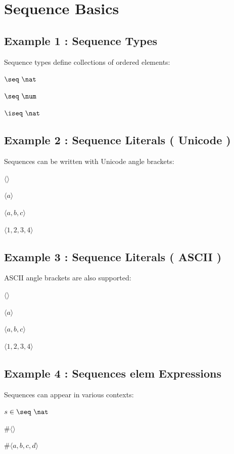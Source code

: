 \documentclass[a4paper,10pt,fleqn]{article}
\begin{document}
\section*{Sequence Basics}

\subsection*{Example 1 : Sequence Types}

\noindent Sequence types define collections of ordered elements:

\bigskip

\noindent
$\seq~\nat$


\noindent
$\seq~\num$


\noindent
$\iseq~\nat$


\subsection*{Example 2 : Sequence Literals ( Unicode )}

\noindent Sequences can be written with Unicode angle brackets:

\bigskip

\noindent
$\langle \rangle$


\noindent
$\langle a \rangle$


\noindent
$\langle a, b, c \rangle$


\noindent
$\langle 1, 2, 3, 4 \rangle$


\subsection*{Example 3 : Sequence Literals ( ASCII )}

\noindent ASCII angle brackets are also supported:

\bigskip

\noindent
$\langle \rangle$


\noindent
$\langle a \rangle$


\noindent
$\langle a, b, c \rangle$


\noindent
$\langle 1, 2, 3, 4 \rangle$


\subsection*{Example 4 : Sequences elem Expressions}

\noindent Sequences can appear in various contexts:

\bigskip

\noindent
$s \in \seq~\nat$


\noindent
$\# \langle \rangle$


\noindent
$\# \langle a, b, c, d \rangle$
\end{document}
